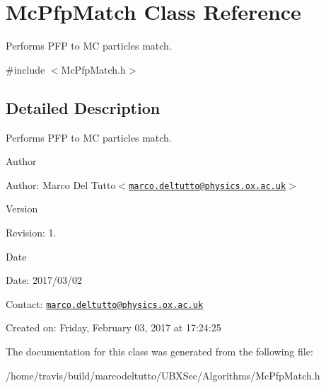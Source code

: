 \hypertarget{classMcPfpMatch}{\section{\-Mc\-Pfp\-Match \-Class \-Reference}
\label{classMcPfpMatch}
}


\-Performs \-P\-F\-P to \-M\-C particles match.  




{\ttfamily \#include $<$\-Mc\-Pfp\-Match.\-h$>$}



\subsection{\-Detailed \-Description}
\-Performs \-P\-F\-P to \-M\-C particles match. 

\begin{DoxyAuthor}{\-Author}

\end{DoxyAuthor}
\begin{DoxyParagraph}{\-Author\-:}
\-Marco \-Del \-Tutto$<$\href{mailto:marco.deltutto@physics.ox.ac.uk}{\tt marco.\-deltutto@physics.\-ox.\-ac.\-uk}$>$ 
\end{DoxyParagraph}


\begin{DoxyVersion}{\-Version}

\end{DoxyVersion}
\begin{DoxyParagraph}{\-Revision\-:}
1. 
\end{DoxyParagraph}


\begin{DoxyDate}{\-Date}

\end{DoxyDate}
\begin{DoxyParagraph}{\-Date\-:}
2017/03/02 
\end{DoxyParagraph}


\-Contact\-: \href{mailto:marco.deltutto@physics.ox.ac.uk}{\tt marco.\-deltutto@physics.\-ox.\-ac.\-uk}

\-Created on\-: \-Friday, \-February 03, 2017 at 17\-:24\-:25 

\-The documentation for this class was generated from the following file\-:\begin{DoxyCompactItemize}
\item 
/home/travis/build/marcodeltutto/\-U\-B\-X\-Sec/\-Algorithms/\-Mc\-Pfp\-Match.\-h\end{DoxyCompactItemize}

